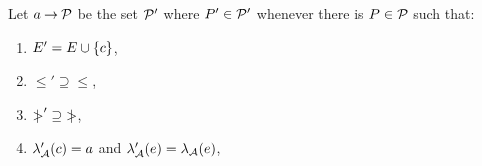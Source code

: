 

\begin{definition}
  \label{def:prefix}
Let $a \mathbin\rightarrow \mathcal{P}$ be the set $\mathcal{P}'$ where $P'\in\mathcal{P}'$ whenever
there is $P\in\mathcal{P}$ such that:
\begin{enumerate}
\item $E' = E \cup \{c\}$,
\item ${\le'}\supseteq{\le}$, %
\item ${\mathrel{\mkern4mu\mid\!\!\!>}'}\supseteq{\mathrel{\mkern4mu\mid\!\!\!>}}$, %
\item $\lambda_{\mathcal{A}}'(c) = a$ and $\lambda_{\mathcal{A}}'(e) = \lambda_{\mathcal{A}}(e)$,

\end{enumerate}
\end{definition}
